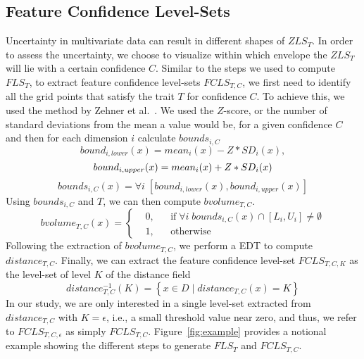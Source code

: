 \subsection{Feature Confidence Level-Sets}
Uncertainty in multivariate data can result in different shapes of $ZLS_{T}$.
%
In order to assess the uncertainty, we choose to visualize within which envelope the $ZLS_{T}$ will lie with a certain confidence $C$.
%
Similar to the steps we used to compute $FLS_{T}$, to extract feature confidence level-sets $FCLS_{T,C}$, we first need to identify all the grid points that satisfy the trait $T$ for confidence $C$.
%
To achieve this, we used the method by Zehner et al.~\cite{zehner2010visualization}. 
%
We used the $Z$-score, or the number of standard deviations from the mean a value would be, for a given confidence $C$ and then for each dimension $i$ calculate $bounds_{i,C}$
\begin{equation}
bound_{i,lower}(x) = mean_{i}(x) - Z*SD_{i}(x),
\end{equation}
\begin{equation}
bound_{i,upper}(x) = mean_{i}(x) + Z*SD_{i}(x)\\
\end{equation}
\begin{equation}
bounds_{i,C}(x) = \forall i \; [bound_{i, lower}(x), bound_{i,upper}(x)]
\end{equation}
%
Using $bounds_{i,C}$ and $T$, we can then compute $bvolume_{T,C}$.
\begin{equation}
  bvolume_{T,C}(x) = \left \{
  \begin{aligned}
    &0, && \text{if}\; \forall i\; bounds_{i, C}(x) \cap [L_{i}, U_{i}] \neq \emptyset \\
    &1, && \text{otherwise}
  \end{aligned} \right.
\end{equation}
%
Following the extraction of $bvolume_{T,C}$, we perform a EDT to compute $distance_{T,C}$.
%
Finally, we can extract the feature confidence level-set $FCLS_{T,C,K}$ as the level-set of level $K$ of the distance field
%
\begin{equation} 
distance_{T,C}^{-1}(K) = \left\{ x \in D\; |\; distance_{T,C}(x) = K\right\}
\end{equation}
%
In our study, we are only interested in a single level-set extracted from $distance_{T,C}$ with $K = \epsilon$, i.e., a small threshold value near zero, and thus, we refer to $FCLS_{T,C,\epsilon}$ as simply $FCLS_{T,C}$.
%
Figure~\ref{fig:example} provides a notional example showing the different steps to generate $FLS_{T}$ and $FCLS_{T,C}$.
